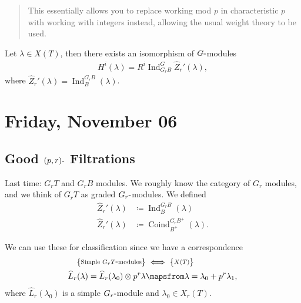 \begin{quote}
This essentially allows you to replace working mod \(p\) in
characteristic \(p\) with working with integers instead, allowing the
usual weight theory to be used.
\end{quote}

\begin{proposition}[?]

Let \(\lambda \in X(T)\), then there exists an isomorphism of
\(G{\hbox{-}}\)modules
\begin{align*}  
H^i(\lambda) = R^i \operatorname{Ind}_{G_r B}^G \widehat{Z}_r ' (\lambda)
,\end{align*}
where
\(\widehat{Z}_r'(\lambda) = \operatorname{Ind}_B^{G_r B}(\lambda)\).

\end{proposition}

\hypertarget{friday-november-06}{%
\section{Friday, November 06}\label{friday-november-06}}

\hypertarget{good-p-rhbox--filtrations}{%
\subsection{\texorpdfstring{Good \((p, r){\hbox{-}}\)
Filtrations}{Good (p, r)\{\textbackslash hbox\{-\}\} Filtrations}}\label{good-p-rhbox--filtrations}}

Last time: \(G_r T\) and \(G_r B\) modules. We roughly know the category
of \(G_r\) modules, and we think of \(G_r T\) as graded
\(G_r{\hbox{-}}\)modules. We defined
\begin{align*}  
\widehat{Z}_r' (\lambda) &\coloneqq\operatorname{Ind}_{B}^{G_r B}(\lambda) \\
\widehat{Z}_r' (\lambda) &\coloneqq\operatorname{Coind}_{B^+}^{G_r B^+}(\lambda)
.\end{align*}

We can use these for classification since we have a correspondence
\begin{align*}  
\left\{{\substack{\text{Simple }G_rT{\hbox{-}}\text{modules}}}\right\}
&\iff
\left\{{\substack{X(T)}}\right\} \\
\widehat{L}_r(\lambda) = \widehat{L}_r(\lambda_0) \otimes p^r \lambda &\mapsfrom \lambda = \lambda_0 + p^r \lambda_1
,\end{align*}
where \(\widehat{L}_r(\lambda_0)\) is a simple \(G_r{\hbox{-}}\)module
and \(\lambda_0 \in X_r(T)\).

